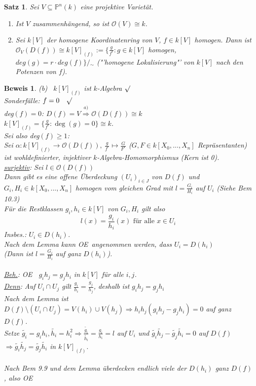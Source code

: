 \documentclass[a4paper,12pt]{report}
\theoremstyle{break}
\newtheorem{Satz}{Satz}
\theoremstyle{nonumberbreak}
\theoremstyle{nonumberplain}
\newtheorem{Bew}{Beweis}
\renewcommand{\OE}{O\!\!E~}
\begin{document}
\begin{Satz}
Sei $V\subseteq \mathbb{P}^n(k)$ eine projektive Varietät.\\
\begin{enumerate}
\item Ist $V$ zusammenhängend, so ist $\mathcal{O}(V)\cong k$.\\
\item Sei $k[V]$ der homogene Koordinatenring von $V$, $f\in k[V]$ homogen. Dann ist
$\mathcal{O}_V(D(f))\cong k[V]_{(f)}:= \{\frac{g}{f^r}: g\in k[V]$ homogen, $deg(g)=r\cdot deg(f)\}/\!\!{}_\sim$
("'homogene Lokalisierung"' von $k[V]$ nach den Potenzen von $f$).
\end{enumerate}
\end{Satz}

\begin{Bew}
(b)~ $k[V]_{(f)}$ ist $k$-Algebra $\surd$\\
Sonderfälle: $f=0~~~\surd$\\
deg$(f)=0$: $D(f)=V\stackrel{a)}{\Rightarrow}\mathcal{O}(D(f))\cong k$\\
$k[V]_{(f)}=\{\frac{g}{f^r}: \operatorname{deg}(g)=0\}\cong k$.\\
Sei also deg$(f)\geq 1$:\\
Sei $\alpha: k[V]_{(f)}\rightarrow \mathcal{O}(D(f)),~\frac{g}{f^r}\mapsto\frac{G}{F^r}$ ($G,F\in k[X_0,...,X_n]$ Repräsentanten) ist wohldefinierter, injektiver $k$-Algebra-Homomorphismus (Kern ist 0).\\
\underline{surjektiv}: Sei $l\in\mathcal{O}(D(f))$\\
Dann gibt es eine offene Überdeckung $(U_i)_{i\in J}$ von $D(f)$ und $G_i, H_i\in k[X_0,...,X_n]$ homogen vom gleichen Grad mit $l=\frac{G_i}{H_i}$ auf $U_i$ (Siehe Bem 10.3)\\
Für die Restklassen $g_i, h_i\in k[V]$ von $G_i, H_i$ gilt also
$$l(x)=\frac{g_i}{h_i}(x) \text{ für alle } x\in U_i$$
Insbes.: $U_i\in D(h_i)$.\\
Nach dem Lemma kann \OE angenommen werden, dass $U_i=D(h_i)$\\
(Dann ist $l=\frac{G_i}{H_i}$ auf ganz $D(h_i)$).\\\\
\underline{Beh.}: \OE $~~g_ih_j=g_jh_i$ in $k[V]$ für alle $i,j$.\\
\underline{Denn}: Auf $U_i\cap U_j$ gilt $\frac{g_i}{h_i}=\frac{g_j}{h_j}$, deshalb ist $g_ih_j=g_jh_i$\\
Nach dem Lemma ist $D(f)\setminus (U_i\cap U_j)=V(h_i)\cup V(h_j)\Rightarrow h_ih_j(g_ih_j-g_jh_i)=0$ auf ganz $D(f)$.\\
Setze $\tilde{g_i}=g_ih_i, \tilde{h_i}=h_i^2\Rightarrow \frac{\tilde{g_i}}{\tilde{h_i}}=\frac{g_i}{h_i}=l$ auf $U_i$ und $\tilde{g_i}\tilde{h_j}-\tilde{g_j}\tilde{h_i}=0$ auf $D(f)$\\
$\Rightarrow \tilde{g_i}\tilde{h_j}=\tilde{g_j}\tilde{h_i}$ in $k[V]_{(f)}$.\\
\\
Nach Bem 9.9 und dem Lemma überdecken endlich viele der $D(h_i)$ ganz $D(f)$, also \OE


\end{Bew}
\end{document}

